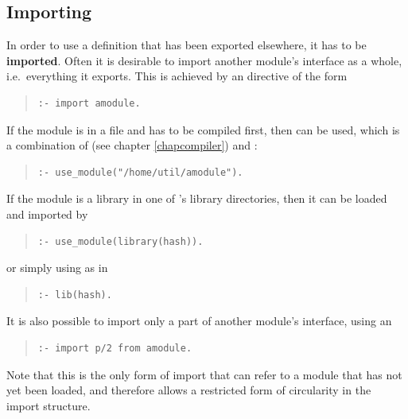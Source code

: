 \subsection{Importing}

In order to use a definition that has been exported elsewhere, it has
to be {\bf imported}.  Often it is desirable to import another module's
interface as a whole, i.e.\ everything it exports.
This is achieved by an
directive of the form
\begin{quote}\begin{verbatim}
:- import amodule.
\end{verbatim}\end{quote}
If the module is in a file and has to be compiled first, then
can be used, which is a combination of
(see chapter \ref{chapcompiler}) and
:
\begin{quote}\begin{verbatim}
:- use_module("/home/util/amodule").
\end{verbatim}\end{quote}
If the module is a library in one of {\eclipse}'s library directories,
then it can be loaded and imported by
\begin{quote}\begin{verbatim}
:- use_module(library(hash)).
\end{verbatim}\end{quote}
or simply using
 as in
\begin{quote}\begin{verbatim}
:- lib(hash).
\end{verbatim}\end{quote}

It is also possible to import only a part of another module's
interface, using an
\begin{quote}\begin{verbatim}
:- import p/2 from amodule.
\end{verbatim}\end{quote}
Note that this is the only form of import that can refer to a module
that has not yet been loaded, and therefore allows a restricted form
of circularity in the import structure.


